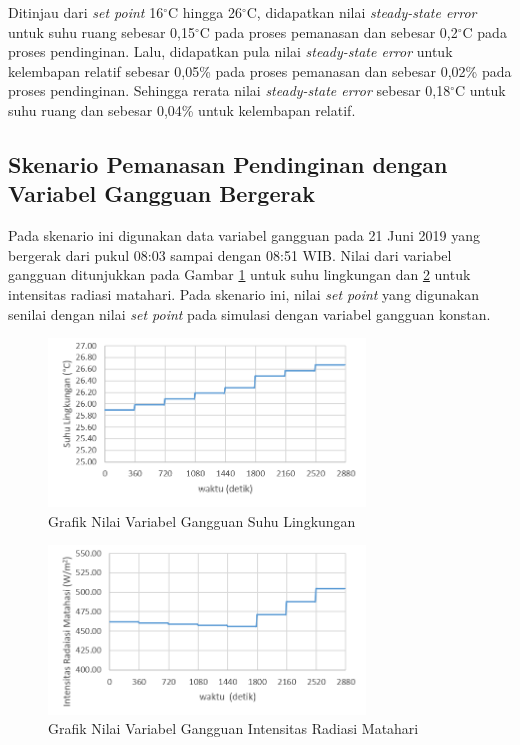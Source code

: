 Ditinjau dari \textit{set point} 16$^\circ$C hingga 26$^\circ$C, didapatkan nilai \textit{steady-state error} untuk suhu ruang sebesar 0,15$^\circ$C pada proses pemanasan dan sebesar 0,2$^\circ$C pada proses pendinginan. Lalu, didapatkan pula nilai \textit{steady-state error} untuk kelembapan relatif sebesar 0,05\% pada proses pemanasan dan sebesar 0,02\% pada proses pendinginan. Sehingga rerata nilai \textit{steady-state error} sebesar 0,18$^\circ$C untuk suhu ruang dan sebesar 0,04\% untuk kelembapan relatif.\\
\vspace{3em}

\subsection{Skenario Pemanasan Pendinginan dengan Variabel Gangguan Bergerak}

Pada skenario ini digunakan data variabel gangguan pada 21 Juni 2019 yang bergerak dari pukul 08:03 sampai dengan 08:51 WIB. Nilai dari variabel gangguan ditunjukkan pada Gambar \ref{fig:5:Simulink2To} untuk suhu lingkungan dan \ref{fig:5:Simulink2RD} untuk intensitas radiasi matahari. Pada skenario ini, nilai \textit{set point} yang digunakan senilai dengan nilai \textit{set point} pada simulasi dengan variabel gangguan konstan.

\begin{figure}[!h]
	\centering
	\includegraphics[width=0.75\textwidth]{figures/Simulink2To}
	\caption{Grafik Nilai Variabel Gangguan Suhu Lingkungan}
	\label{fig:5:Simulink2To}
\end{figure}

\begin{figure}[!h]
	\centering
	\includegraphics[width=0.75\textwidth]{figures/Simulink2RD}
	\caption{Grafik Nilai Variabel Gangguan Intensitas Radiasi Matahari}
	\label{fig:5:Simulink2RD}
\end{figure}
\vspace{1em}

